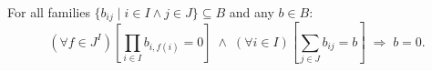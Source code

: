 For all families $\{b_{ij} \mid i \in I \land j \in J\} \subseteq B$ and any $b \in B$:
$$
(\forall f \in J^I) \left[ \prod_{i \in I} b_{i, f(i)} = 0 \right] \;\land\; (\forall i \in I)\left[ \sum_{j \in J} b_{ij} = b \right] \;\Longrightarrow\; b = 0.
$$
